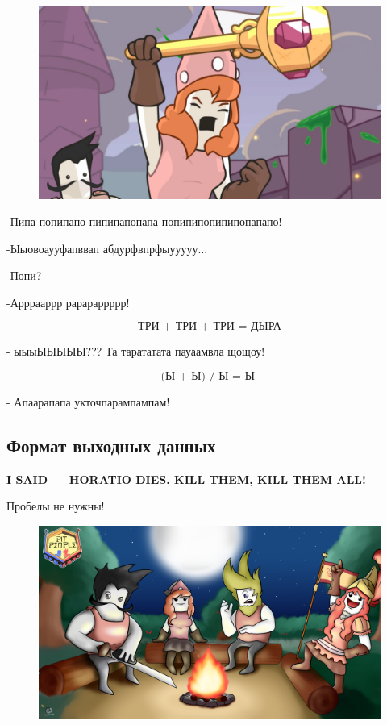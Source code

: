 \documentclass[12pt]{scrartcl}
\begin{document}
\begin{figure}[h]
	\centering
    \includegraphics[width=0.5\linewidth]{yyyyy2}
\end{figure}

-Пипа попипапо пипипапопапа попипипопипипопапапо!

-Ыыовоаууфапввап абдурфвпрфыууууу...

-Попи?

-Арррааррр рарараррррр!
 
 \begin{equation*}
  \text{ТРИ + ТРИ + ТРИ = ДЫРА}
\end{equation*}

- ыыыЫЫЫЫЫ??? Та тарататата пауаамвла щощоу!
 
\begin{equation*}
  \text{(Ы + Ы) / Ы = Ы }
\end{equation*}

- Апаарапапа укточпарампампам!

\subsection*{Формат выходных данных}

{
\textbf{I SAID --- HORATIO DIES. KILL THEM, KILL THEM ALL!} 
}

{
\tiny Пробелы не нужны!
}

\begin{figure}[h]
	\centering
    \includegraphics[width=0.6\linewidth]{yyyyyy!}
\end{figure}
\end{document}

